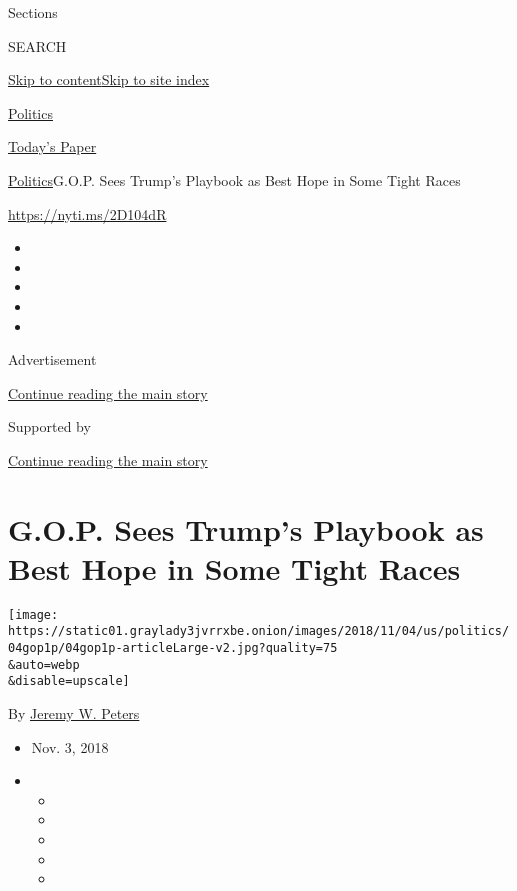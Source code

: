 Sections

SEARCH

\protect\hyperlink{site-content}{Skip to
content}\protect\hyperlink{site-index}{Skip to site index}

\href{https://www.nytimes3xbfgragh.onion/section/politics}{Politics}

\href{https://myaccount.nytimes3xbfgragh.onion/auth/login?response_type=cookie\&client_id=vi}{}

\href{https://www.nytimes3xbfgragh.onion/section/todayspaper}{Today's
Paper}

\href{/section/politics}{Politics}\textbar{}G.O.P. Sees Trump's Playbook
as Best Hope in Some Tight Races

\url{https://nyti.ms/2D104dR}

\begin{itemize}
\item
\item
\item
\item
\item
\end{itemize}

Advertisement

\protect\hyperlink{after-top}{Continue reading the main story}

Supported by

\protect\hyperlink{after-sponsor}{Continue reading the main story}

\hypertarget{gop-sees-trumps-playbook-as-best-hope-in-some-tight-races}{%
\section{G.O.P. Sees Trump's Playbook as Best Hope in Some Tight
Races}\label{gop-sees-trumps-playbook-as-best-hope-in-some-tight-races}}

\texttt{[image: https://static01.graylady3jvrrxbe.onion/images/2018/11/04/us/politics/04gop1p/04gop1p-articleLarge-v2.jpg?quality=75\\\&auto=webp\\\&disable=upscale]}

By \href{https://www.nytimes3xbfgragh.onion/by/jeremy-w-peters}{Jeremy
W. Peters}

\begin{itemize}
\item
  Nov. 3, 2018
\item
  \begin{itemize}
  \item
  \item
  \item
  \item
  \item
  \end{itemize}
\end{itemize}

